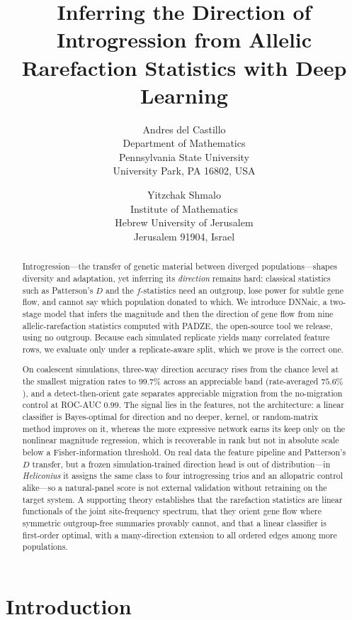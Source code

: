 \documentclass[11pt]{article}
\title{Inferring the Direction of Introgression from Allelic Rarefaction Statistics with Deep Learning}
\author{
    Andres del Castillo \\
    {\small Department of Mathematics} \\
    {\small Pennsylvania State University} \\
    {\small University Park, PA 16802, USA} \\ 
    \and
    Yitzchak Shmalo \\
    {\small Institute of Mathematics} \\
    {\small Hebrew University of Jerusalem} \\
    {\small Jerusalem 91904, Israel} \\
}
\date{} %
\theoremstyle{plain}
\theoremstyle{definition}
\theoremstyle{remark}
\begin{document}
\maketitle






\begin{abstract}
Introgression---the transfer of genetic material between diverged populations---shapes diversity and adaptation, yet inferring its \emph{direction} remains hard: classical statistics such as Patterson's $D$ and the $f$-statistics need an outgroup, lose power for subtle gene flow, and cannot say which population donated to which. We introduce DNNaic, a two-stage model that infers the magnitude and then the direction of gene flow from nine allelic-rarefaction statistics computed with PADZE, the open-source tool we release, using no outgroup. Because each simulated replicate yields many correlated feature rows, we evaluate only under a replicate-aware split, which we prove is the correct one.

On coalescent simulations, three-way direction accuracy rises from the chance level at the smallest migration rates to $99.7\%$ across an appreciable band (rate-averaged $75.6\%$), and a detect-then-orient gate separates appreciable migration from the no-migration control at ROC-AUC $0.99$. The signal lies in the features, not the architecture: a linear classifier is Bayes-optimal for direction and no deeper, kernel, or random-matrix method improves on it, whereas the more expressive network earns its keep only on the nonlinear magnitude regression, which is recoverable in rank but not in absolute scale below a Fisher-information threshold. On real data the feature pipeline and Patterson's $D$ transfer, but a frozen simulation-trained direction head is out of distribution---in \textit{Heliconius} it assigns the same class to four introgressing trios and an allopatric control alike---so a natural-panel score is not external validation without retraining on the target system. A supporting theory establishes that the rarefaction statistics are linear functionals of the joint site-frequency spectrum, that they orient gene flow where symmetric outgroup-free summaries provably cannot, and that a linear classifier is first-order optimal, with a many-direction extension to all ordered edges among more populations.
\end{abstract}

\tableofcontents

\section{Introduction}
\end{document}
